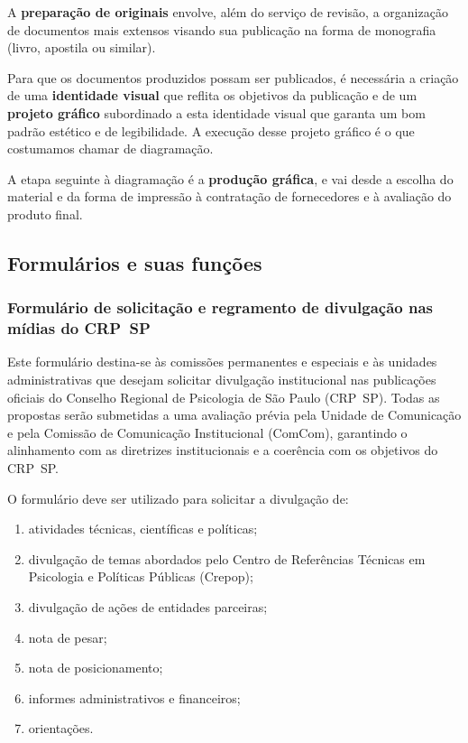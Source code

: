 A \textbf{preparação de originais} envolve, além do serviço de revisão,
a organização de documentos mais extensos visando sua publicação na
forma de monografia (livro, apostila ou similar).

Para que os documentos produzidos possam ser publicados, é necessária a
criação de uma \textbf{identidade visual} que reflita os objetivos da
publicação e de um \textbf{projeto gráfico} subordinado a esta
identidade visual que garanta um bom padrão estético e de legibilidade.
A execução desse projeto gráfico é o que costumamos chamar de
diagramação.

A etapa seguinte à diagramação é a \textbf{produção gráfica}, e vai
desde a escolha do material e da forma de impressão à contratação de
fornecedores e à avaliação do produto final.

\subsection{Formulários e suas
  funções}

\subsubsection{Formulário de solicitação e regramento de divulgação nas
  mídias do
  CRP~SP}

Este formulário destina-se às comissões permanentes e especiais e às
unidades administrativas que desejam solicitar divulgação institucional
nas publicações oficiais do Conselho Regional de Psicologia de São Paulo
(CRP~SP). Todas as propostas serão submetidas a uma avaliação prévia
pela Unidade de Comunicação e pela Comissão de Comunicação Institucional
(ComCom), garantindo o alinhamento com as diretrizes institucionais e a
coerência com os objetivos do CRP~SP.

O formulário deve ser utilizado para solicitar a divulgação de:

\begin{enumerate}

  \item
        atividades técnicas, científicas e políticas;
  \item
        divulgação de temas abordados pelo Centro de Referências Técnicas em
        Psicologia e Políticas Públicas (Crepop);
  \item
        divulgação de ações de entidades parceiras;
  \item
        nota de pesar;
  \item
        nota de posicionamento;
  \item
        informes administrativos e financeiros;
  \item
        orientações.
\end{enumerate}


